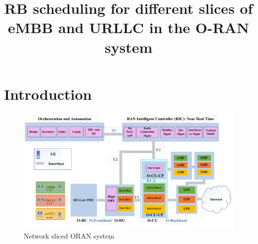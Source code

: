 \documentclass[conference]{IEEEtran}
\begin{document}
\title{RB scheduling for different slices of eMBB and URLLC in the O-RAN system \vspace{-.1cm}
}
%

\maketitle

\begin{abstract}

\end{abstract}
\section{Introduction} 

\begin{figure}
  \centering 
    \includegraphics[scale = 0.5]{finalDraw.pdf}
  \caption{Network sliced ORAN system}
  \label{fig:c11}
\end{figure}
\end{document}
